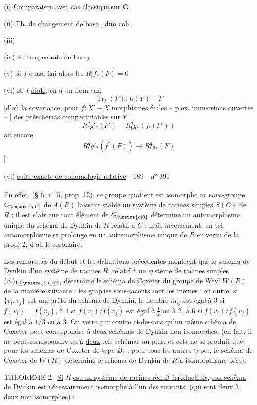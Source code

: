 (i) \uline{Comparaison avec cas classique} sur $\mathbf C$

(ii) \uline{Th. de changement de base} , \uline{dim} \uline{coh.}

(iii)  

(iv) Suite spectrale de Leray

(v) Si $f$ quasi-fini  alors les $R^i_!f_*(F)=0$

(vi) Si $f$ \uline{étale}, on a un hom can.
\[
\operatorname{Tr}_f(F):f_!(F)\mathbin{-}F
\]
[d'où la covariance, pour $f:X'\mathbin{-}X$ morphismes étales -- p.ex. immersions ouvertes -- ] des préschémas compactifiables sur $Y$
\[
R^q_!g'_*(F')\mathbin{-}R^q_!g_*(f_!(F'))
\]
ou encore
\[
R^q_!g'_*(f^*(F))\longrightarrow R^q_!g_*(F)
\]
]

(vi) \uline{suite exacte de cohomologie relative}
- 189 - \hfill n\textsuperscript{o} 391

En effet, (§ 6, n\textsuperscript{o} 5, prop. 12), ce groupe quotient est isomorphe au sous-groupe $G_{\unsure{o|0}}$ de $A(R)$ laissant stable un système de racines simples $S(C)$ de $R$ ; il est clair que tout élément de $G_{\unsure{o|0}}$ détermine un automorphisme unique du schéma de Dynkin de $R$ relatif à $C$ ; mais inversement, un tel automorphisme se prolonge en un automorphisme unique de $R$ en vertu de la prop. 2, d'où le corollaire.

Les remarques du début et les définitions précédentes montrent que le schéma de Dynkin d'un système de racines $R$, relatif à un système de racines simples $(v_i)_{1\leq\unsure{j|i}\leq\ell}$, détermine le schéma de Coxeter du groupe de Weyl $W(R)$ de la manière suivante : les graphes sous-jacents sont les mêmes ; en outre, si $\{v_i,v_j\}$ est une arête du schéma de Dynkin, le nombre $m_{ij}$ est égal à $3$ si $f(v_i)=f(v_j)$, à $4$ si $f(v_i)/f(v_j)$ est égal à $\frac12$ ou à $2$, à $6$ si $f(v_i)/f(v_j)$ est égal à $1/3$ ou à $3$. On verra par contre ci-dessous qu'un même schéma de Coxeter peut correspondre à deux schémas de Dynkin non isomorphes, (en fait, il ne peut correspondre qu'à \uline{deux} tels schémas au plus, et cela ne se produit que pour les schémas de Coxeter de type $B_\ell$ ; pour tous les autres types, le schéma de Coxeter de $W(R)$ détermine le schéma de Dynkin de $R$ à isomorphisme près).

THEOREME 2.- \uline{Si} $R$ \uline{est un système de racines réduit irréductible}, \uline{son schéma de Dynkin est nécessairement isomorphe à l'un des suivants}, (\uline{qui sont deux à deux non isomorphes}) :

